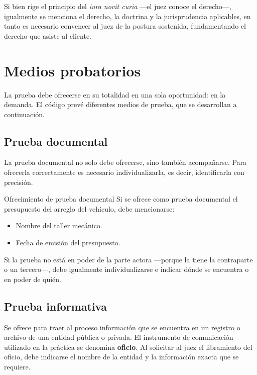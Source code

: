 \documentclass[12pt,oneside]{book}
\begin{document}
\begin{note}
Si bien rige el principio del \textit{iura novit curia} —el juez conoce el derecho—, igualmente se menciona el derecho, la doctrina y la jurisprudencia aplicables, en tanto es necesario convencer al juez de la postura sostenida, fundamentando el derecho que asiste al cliente.
\end{note}

\chapter{Medios probatorios}

La prueba debe ofrecerse en su totalidad en una sola oportunidad: en la demanda. El código prevé diferentes medios de prueba, que se desarrollan a continuación.

\section{Prueba documental}

La prueba documental no solo debe ofrecerse, sino también acompañarse. Para ofrecerla correctamente es necesario individualizarla, es decir, identificarla con precisión.

\begin{example}{Ofrecimiento de prueba documental}
Si se ofrece como prueba documental el presupuesto del arreglo del vehículo, debe mencionarse:
\begin{itemize}
    \item Nombre del taller mecánico.
    \item Fecha de emisión del presupuesto.
\end{itemize}
\end{example}

Si la prueba no está en poder de la parte actora —porque la tiene la contraparte o un tercero—, debe igualmente individualizarse e indicar dónde se encuentra o en poder de quién.

\section{Prueba informativa}

Se ofrece para traer al proceso información que se encuentra en un registro o archivo de una entidad pública o privada. El instrumento de comunicación utilizado en la práctica se denomina \textbf{oficio}. Al solicitar al juez el libramiento del oficio, debe indicarse el nombre de la entidad y la información exacta que se requiere.
\end{document}
